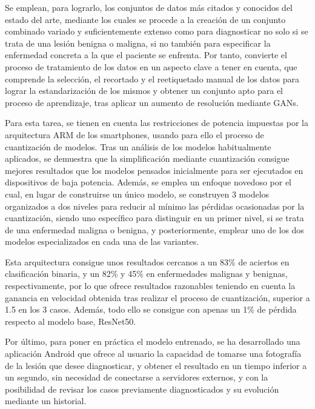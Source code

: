 Se emplean, para lograrlo, los conjuntos de datos más citados y conocidos del estado del arte, mediante los cuales se procede a la creación de un conjunto combinado variado y suficientemente extenso como para diagnosticar no solo si se trata de una lesión benigna o maligna, si no también para especificar la enfermedad concreta a la que el paciente se enfrenta. Por tanto, convierte el proceso de tratamiento de los datos en un aspecto clave a tener en cuenta, que comprende la selección, el recortado y el reetiquetado manual de los datos para lograr la estandarización de los mismos y obtener un conjunto apto para el proceso de aprendizaje, tras aplicar un aumento de resolución mediante GANs.

Para esta tarea, se tienen en cuenta las restricciones de potencia impuestas por la arquitectura ARM de los smartphones, usando para ello el proceso de cuantización de modelos. Tras un análisis de los modelos habitualmente aplicados, se demuestra que la simplificación mediante cuantización consigue mejores resultados que los modelos pensados inicialmente para ser ejecutados en dispositivos de baja potencia. Además, se emplea un enfoque novedoso por el cual, en lugar de construirse un único modelo, se construyen 3 modelos organizados a dos niveles para reducir al mínimo las pérdidas ocasionadas por la cuantización, siendo uno específico para distinguir en un primer nivel, si se trata de una enfermedad maligna o benigna, y posteriormente, emplear uno de los dos modelos especializados en cada una de las variantes.

Esta arquitectura consigue unos resultados cercanos a un 83\% de aciertos en clasificación binaria, y un 82\%  y 45\% en enfermedades malignas y benignas, respectivamente, por lo que ofrece resultados razonables teniendo en cuenta la ganancia en velocidad obtenida tras realizar el proceso de cuantización, superior a 1.5 en los 3 casos. Además, todo ello se consigue con apenas un 1\% de pérdida respecto al modelo base, ResNet50.

Por último, para poner en práctica el modelo entrenado, se ha desarrollado una aplicación Android que ofrece al usuario la capacidad de tomarse una fotografía de la lesión que desee diagnosticar, y obtener el resultado en un tiempo inferior a un segundo, sin necesidad de conectarse a servidores externos, y con la posibilidad de revisar los casos previamente diagnosticados y su evolución mediante un historial. 

\cleardoublepage
\thispagestyle{empty}


